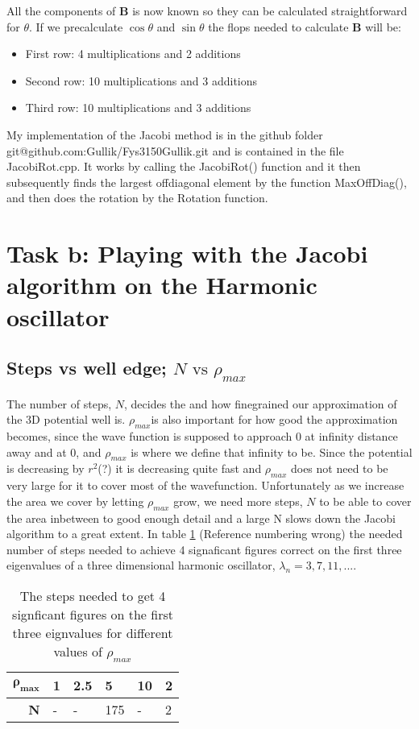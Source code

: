 \documentclass[11pt,a4wide]{article}
\begin{document}
		\noindent All the components of \(\mathbf{B}\) is now known so they can be calculated straightforward for \(\theta\).
		If we precalculate \(\cos{\theta}\) and \(\sin{\theta}\) the flops needed to calculate \(\mathbf{B}\) will be:
		
		\begin{itemize}
		\item First row: 4 multiplications and 2 additions
		\item Second row: 10 multiplications and 3 additions
		\item Third row: 10 multiplications and 3 additions
		\end{itemize}
		
		My implementation of the Jacobi method is in the github folder git@github.com:Gullik/Fys3150Gullik.git and is 
		contained in the file JacobiRot.cpp. It works by calling the JacobiRot() function and it then subsequently finds the 
		largest offdiagonal element by the function MaxOffDiag(), and then does the rotation by the Rotation function.

\section{Task b: Playing with the Jacobi algorithm on the Harmonic oscillator}
	\subsection{Steps vs well edge; \(N \text{ vs }\rho_{max}\)} 
	The number of steps, \(N\), decides the and how finegrained our approximation of the 3D potential well is.
	 \(\rho_{max} \)is also important for how good the approximation becomes, since the wave function is supposed to approach
	 0 at infinity distance away and at \(0\), and \(\rho_{max}\) is where we define that infinity to be. Since the potential is decreasing by \(r^2\)(?)
	 it is decreasing quite fast and \(\rho_{max} \) does not need to be very large for it to cover most of the wavefunction.
	 Unfortunately as we increase the area we cover by letting \(\rho_{max} \) grow, we need more steps, \(N\) to be able to cover
	 the area inbetween to good enough detail and a large N slows down the Jacobi algorithm to a great extent. 
	 In table \ref{table:Steps} (Reference numbering wrong) the needed number of steps needed to achieve 4 signaficant figures correct
	  on the first three eigenvalues of a three dimensional harmonic oscillator, \(\lambda_n = 3, 7 , 11 , ...\).
	
	\begin{table}
		\begin{tabular}{|r|l|l|l|l|l|}
		\hline 
		\(\mathbf{\rho_{max}}\) 	& 1 	& 2.5	& 5	  &		10	&	2
		\\
		\hline
		\textbf{N} 					& - 	& 	-	& 175 &		- 	&	2	
		\\ \hline
		\end{tabular}
	\label{table:Steps}
	\caption{The steps needed to get 4 signficant figures on the first three eignvalues for different values of \(\rho_{max}\)}
	\end{table}
	
\end{document}
